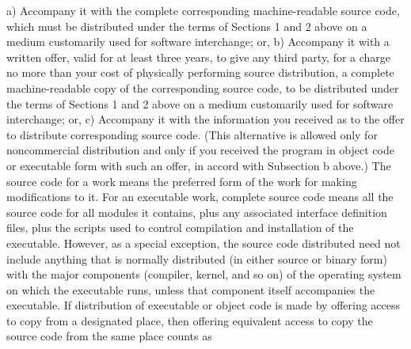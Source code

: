 \begin{DoxyCodeInclude}
\textcolor{stringliteral}{}
\textcolor{stringliteral}{    a) Accompany it with the complete corresponding machine-readable}
\textcolor{stringliteral}{    source code, which must be distributed under the terms of Sections}
\textcolor{stringliteral}{    1 and 2 above on a medium customarily used for software interchange; or,}
\textcolor{stringliteral}{}
\textcolor{stringliteral}{    b) Accompany it with a written offer, valid for at least three}
\textcolor{stringliteral}{    years, to give any third party, for a charge no more than your}
\textcolor{stringliteral}{    cost of physically performing source distribution, a complete}
\textcolor{stringliteral}{    machine-readable copy of the corresponding source code, to be}
\textcolor{stringliteral}{    distributed under the terms of Sections 1 and 2 above on a medium}
\textcolor{stringliteral}{    customarily used for software interchange; or,}
\textcolor{stringliteral}{}
\textcolor{stringliteral}{    c) Accompany it with the information you received as to the offer}
\textcolor{stringliteral}{    to distribute corresponding source code.  (This alternative is}
\textcolor{stringliteral}{    allowed only for noncommercial distribution and only if you}
\textcolor{stringliteral}{    received the program in object code or executable form with such}
\textcolor{stringliteral}{    an offer, in accord with Subsection b above.)}
\textcolor{stringliteral}{}
\textcolor{stringliteral}{The source code for a work means the preferred form of the work for}
\textcolor{stringliteral}{making modifications to it.  For an executable work, complete source}
\textcolor{stringliteral}{code means all the source code for all modules it contains, plus any}
\textcolor{stringliteral}{associated interface definition files, plus the scripts used to}
\textcolor{stringliteral}{control compilation and installation of the executable.  However, as a}
\textcolor{stringliteral}{special exception, the source code distributed need not include}
\textcolor{stringliteral}{anything that is normally distributed (in either source or binary}
\textcolor{stringliteral}{form) with the major components (compiler, kernel, and so on) of the}
\textcolor{stringliteral}{operating system on which the executable runs, unless that component}
\textcolor{stringliteral}{itself accompanies the executable.}
\textcolor{stringliteral}{}
\textcolor{stringliteral}{If distribution of executable or object code is made by offering}
\textcolor{stringliteral}{access to copy from a designated place, then offering equivalent}
\textcolor{stringliteral}{access to copy the source code from the same place counts as}

\end{DoxyCodeInclude}
